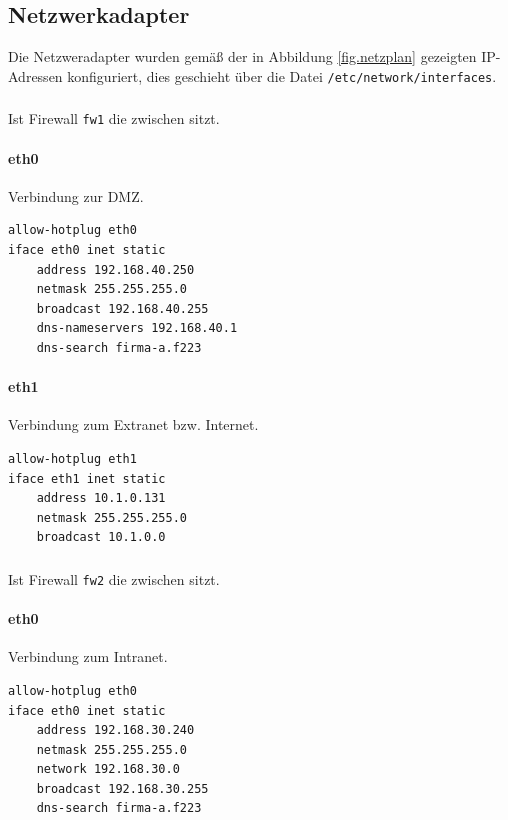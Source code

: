 \subsection{Netzwerkadapter}\label{sec.netzwerk}

Die Netzweradapter wurden gemäß der in Abbildung \ref{fig.netzplan}
gezeigten IP-Adressen konfiguriert, dies geschieht über die Datei
{\tt /etc/network/interfaces}.

\subsubsection{\fwa}

Ist Firewall {\tt fw1} die zwischen \fwa sitzt.

\paragraph{eth0} Verbindung zur DMZ.

\begin{lstlisting}[label=lst:fw1:eth0,caption={Netzwerkadapter eth0 Konfiguration.}]
allow-hotplug eth0
iface eth0 inet static
    address 192.168.40.250
    netmask 255.255.255.0
    broadcast 192.168.40.255
    dns-nameservers 192.168.40.1
    dns-search firma-a.f223
\end{lstlisting}

\paragraph{eth1} Verbindung zum Extranet bzw. Internet.

\begin{lstlisting}[label=lst:fw1:eth1,caption={Netzwerkadapter eth1 Konfiguration.}]
allow-hotplug eth1
iface eth1 inet static
    address 10.1.0.131
    netmask 255.255.255.0
    broadcast 10.1.0.0
\end{lstlisting}


\subsubsection{\fwb}

Ist Firewall {\tt fw2} die zwischen \fwb sitzt.

\paragraph{eth0} Verbindung zum Intranet.

\begin{lstlisting}[label=lst:fw2:eth0,caption={Netzwerkadapter eth0 Konfiguration.}]
allow-hotplug eth0
iface eth0 inet static
    address 192.168.30.240
    netmask 255.255.255.0
    network 192.168.30.0
    broadcast 192.168.30.255
    dns-search firma-a.f223
\end{lstlisting}

